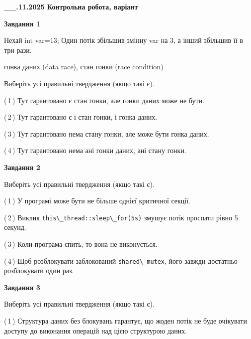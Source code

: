 \documentclass[12pt, ukrainian]{article}
\def\code#1{\Verb!#1!}
\begin{document}
\begin {large}

\textbf{\_\_.11.2025 Контрольна робота, варіант  }\par


{

\begin{center}
\textbf{Завдання 1}
\end{center}
Нехай int var=13; Один потік збільшив змінну var на 3, а інший збільшив її в три рази.

гонка даних (data race), стан гонки (race condition)

Виберіть усі правильні твердження (якщо такі є).\par
\vspace{2mm}
(\,1\,) Тут гарантовано є стан гонки, але гонки даних може не бути.%

(\,2\,) Тут гарантовано є і стан гонки, і гонка даних.%

(\,3\,) Тут гарантовано нема стану гонки, але може бути гонка даних.%

(\,4\,) Тут гарантовано нема ані гонки даних, ані стану гонки.%



\begin{center}
\textbf{Завдання 2}
\end{center}
Виберіть усі правильні твердження (якщо такі є).\par
\vspace{2mm}

(\,1\,) У програмі може бути не більше однієї критичної секції.%

(\,2\,) Виклик \code{this\_thread::sleep\_for(5s)} змушує потік проспати рівно 5 секунд.%

(\,3\,) Коли програма спить, то вона не виконується.%

(\,4\,) Щоб розблокувати заблокований \code{shared\_mutex}, його завжди достатньо розблокувати один раз.%



\begin{center}
\textbf{Завдання 3}
\end{center}
Виберіть усі правильні твердження (якщо такі є).\par
\vspace{2mm}

(\,1\,) Структура даних без блокувань гарантує, що жоден потік не буде очікувати доступу до виконання операцій над цією структурою даних.%

}
\end{large}
\end{document}
